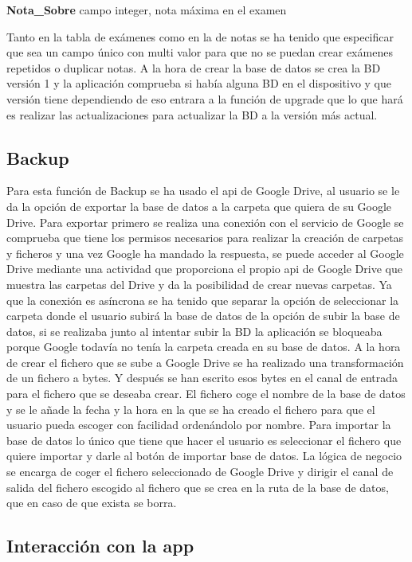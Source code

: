 \textbf{Nota\_Sobre} campo integer, nota máxima en el examen


Tanto en la tabla de exámenes como en la de notas se ha tenido que especificar que sea un campo único con multi valor para que no se puedan crear exámenes repetidos o duplicar notas.
A la hora de crear la base de datos se crea la BD versión 1 y la aplicación comprueba si había alguna BD en el dispositivo y que versión tiene dependiendo de eso entrara a la función de upgrade que lo que hará es realizar las actualizaciones para actualizar la BD a la versión más actual.

\subsection{Backup}
\label{subsecc:Backup}

Para esta función de Backup se ha usado el api de Google Drive, al usuario se le da la opción de exportar la base de datos a la carpeta que quiera de su Google Drive.
Para exportar primero se realiza una conexión con el servicio de Google se comprueba que tiene los permisos necesarios para realizar la creación de carpetas y ficheros y una vez Google ha mandado la respuesta, se puede acceder al Google Drive mediante una actividad que proporciona el propio api de Google Drive que muestra las carpetas del Drive y da la posibilidad de crear nuevas carpetas. 
Ya que la conexión es  asíncrona se ha tenido que separar la opción de seleccionar la carpeta donde el usuario subirá la base de datos de la opción de subir la base de datos,  si se realizaba junto al intentar subir la BD la aplicación se bloqueaba porque Google todavía no tenía la carpeta creada en su base de datos. 
A la hora de crear el fichero que se sube a Google Drive se ha realizado una transformación de un fichero a bytes.
Y después se han escrito esos bytes en el canal de entrada para el fichero que se deseaba crear.
El fichero coge el nombre de la base de datos y se le añade la fecha y la hora en la que se ha creado el fichero para que el usuario pueda escoger con facilidad ordenándolo por nombre.
Para importar la base de datos lo único que tiene que hacer el usuario es seleccionar el fichero que quiere importar y darle al botón de importar base de datos.
La lógica de negocio se encarga de coger el fichero seleccionado de Google Drive y dirigir el canal de salida del fichero escogido al fichero que se crea en la ruta de la base de datos, que en caso de que exista se borra.

\subsection{Interacción con la app}
\label{subsecc:Interacción con la app}

